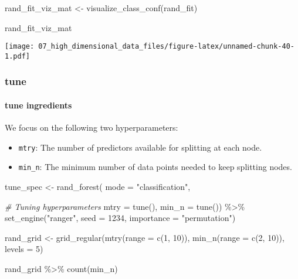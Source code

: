 \documentclass[
]{book}
\newenvironment{Shaded}{\begin{snugshade}}{\end{snugshade}}
\newcommand{\AttributeTok}[1]{\textcolor[rgb]{0.77,0.63,0.00}{#1}}
\newcommand{\CommentTok}[1]{\textcolor[rgb]{0.56,0.35,0.01}{\textit{#1}}}
\newcommand{\DecValTok}[1]{\textcolor[rgb]{0.00,0.00,0.81}{#1}}
\newcommand{\FunctionTok}[1]{\textcolor[rgb]{0.00,0.00,0.00}{#1}}
\newcommand{\NormalTok}[1]{#1}
\newcommand{\OtherTok}[1]{\textcolor[rgb]{0.56,0.35,0.01}{#1}}
\newcommand{\SpecialCharTok}[1]{\textcolor[rgb]{0.00,0.00,0.00}{#1}}
\newcommand{\StringTok}[1]{\textcolor[rgb]{0.31,0.60,0.02}{#1}}
\begin{document}
\begin{Shaded}
\begin{Highlighting}[]
\NormalTok{rand\_fit\_viz\_mat }\OtherTok{\textless{}{-}} \FunctionTok{visualize\_class\_conf}\NormalTok{(rand\_fit)}

\NormalTok{rand\_fit\_viz\_mat}
\end{Highlighting}
\end{Shaded}

\texttt{[image: 07\_high\_dimensional\_data\_files/figure-latex/unnamed-chunk-40-1.pdf]}

\hypertarget{tune-2}{%
\subsubsection{tune}\label{tune-2}}

\hypertarget{tune-ingredients-2}{%
\paragraph{tune ingredients}\label{tune-ingredients-2}}

We focus on the following two hyperparameters:

\begin{itemize}
\item
  \texttt{mtry}: The number of predictors available for splitting at each node.
\item
  \texttt{min\_n}: The minimum number of data points needed to keep splitting nodes.
\end{itemize}

\begin{Shaded}
\begin{Highlighting}[]
\NormalTok{tune\_spec }\OtherTok{\textless{}{-}} 
  \FunctionTok{rand\_forest}\NormalTok{(}
           \AttributeTok{mode =} \StringTok{"classification"}\NormalTok{,}
           
           \CommentTok{\# Tuning hyperparameters}
           \AttributeTok{mtry =} \FunctionTok{tune}\NormalTok{(), }
           \AttributeTok{min\_n =} \FunctionTok{tune}\NormalTok{()) }\SpecialCharTok{\%\textgreater{}\%}
  \FunctionTok{set\_engine}\NormalTok{(}\StringTok{"ranger"}\NormalTok{,}
             \AttributeTok{seed =} \DecValTok{1234}\NormalTok{, }
             \AttributeTok{importance =} \StringTok{"permutation"}\NormalTok{)}

\NormalTok{rand\_grid }\OtherTok{\textless{}{-}} \FunctionTok{grid\_regular}\NormalTok{(}\FunctionTok{mtry}\NormalTok{(}\AttributeTok{range =} \FunctionTok{c}\NormalTok{(}\DecValTok{1}\NormalTok{, }\DecValTok{10}\NormalTok{)),}
                          \FunctionTok{min\_n}\NormalTok{(}\AttributeTok{range =} \FunctionTok{c}\NormalTok{(}\DecValTok{2}\NormalTok{, }\DecValTok{10}\NormalTok{)),}
                          \AttributeTok{levels =} \DecValTok{5}\NormalTok{)}

\NormalTok{rand\_grid }\SpecialCharTok{\%\textgreater{}\%}
  \FunctionTok{count}\NormalTok{(min\_n)}
\end{Highlighting}
\end{Shaded}
\end{document}
